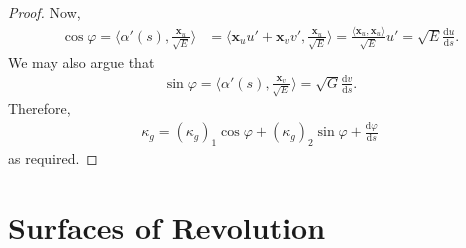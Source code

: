\documentclass[10pt]{article}
\newcommand{\dee}{\mathrm{d}}
\newcommand{\ve}[1]{\mathbf{#1}}
\begin{document}
\begin{itemize}
\begin{proof}
      Now,
      \begin{align*}
        \cos \varphi = \bigg\langle \alpha'(s), \frac{\ve{x}_u}{\sqrt{E}} \bigg\rangle
        &= \bigg\langle \ve{x}_u u' + \ve{x}_v v', \frac{\ve{x}_u}{\sqrt{E}} \bigg\rangle = \frac{\langle \ve{x}_u, \ve{x}_u \rangle}{\sqrt{E}} u' = \sqrt{E} \frac{\dee u}{\dee s}.
      \end{align*}
      We may also argue that
      \begin{align*}
        \sin\varphi 
        = \bigg\langle \alpha'(s), \frac{\ve{x}_v}{\sqrt{E}} \bigg\rangle
        = \sqrt{G} \frac{\dee v}{\dee s}.
      \end{align*}
      Therefore,
      \begin{align*}
        \kappa_g = (\kappa_g)_1 \cos \varphi + (\kappa_g)_2 \sin \varphi + \frac{\dee \varphi}{\dee s}
      \end{align*}
      as required.
    \end{proof}    
  \end{itemize}  

  \section{Surfaces of Revolution}
\end{document}
